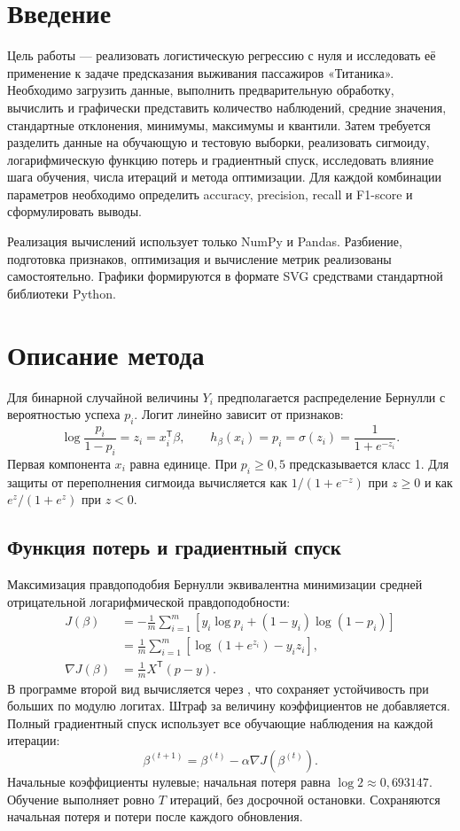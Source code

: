 \section{Введение}
Цель работы — реализовать логистическую регрессию с нуля и исследовать её применение к задаче предсказания выживания пассажиров «Титаника».
Необходимо загрузить данные, выполнить предварительную обработку, вычислить и графически представить количество наблюдений, средние значения, стандартные отклонения, минимумы, максимумы и квантили. Затем требуется разделить данные на обучающую и тестовую выборки, реализовать сигмоиду, логарифмическую функцию потерь и градиентный спуск, исследовать влияние шага обучения, числа итераций и метода оптимизации. Для каждой комбинации параметров необходимо определить accuracy, precision, recall и F1-score и сформулировать выводы.

Реализация вычислений использует только NumPy и Pandas. Разбиение, подготовка признаков, оптимизация и вычисление метрик реализованы самостоятельно. Графики формируются в формате SVG средствами стандартной библиотеки Python.

\section{Описание метода}
Для бинарной случайной величины $Y_i$ предполагается распределение Бернулли с вероятностью успеха $p_i$. Логит линейно зависит от признаков:
\[
\log\frac{p_i}{1-p_i}=z_i=x_i^\mathsf{T}\beta,\qquad
h_{\beta}(x_i)=p_i=\sigma(z_i)=\frac{1}{1+e^{-z_i}}.
\]
Первая компонента $x_i$ равна единице. При $p_i\geq0{,}5$ предсказывается класс 1. Для защиты от переполнения сигмоида вычисляется как $1/(1+e^{-z})$ при $z\geq0$ и как $e^z/(1+e^z)$ при $z<0$.

\subsection{Функция потерь и градиентный спуск}
Максимизация правдоподобия Бернулли эквивалентна минимизации средней отрицательной логарифмической правдоподобности:
\begin{align*}
J(\beta)
&=-\frac{1}{m}\sum_{i=1}^{m}\left[y_i\log p_i+(1-y_i)\log(1-p_i)\right]\\
&=\frac{1}{m}\sum_{i=1}^{m}\left[\log(1+e^{z_i})-y_i z_i\right],\\
\nabla J(\beta)&=\frac{1}{m}X^\mathsf{T}(p-y).
\end{align*}
В программе второй вид вычисляется через , что сохраняет устойчивость при больших по модулю логитах. Штраф за величину коэффициентов не добавляется. Полный градиентный спуск использует все обучающие наблюдения на каждой итерации:
\[
\beta^{(t+1)}=\beta^{(t)}-\alpha\nabla J(\beta^{(t)}).
\]
Начальные коэффициенты нулевые; начальная потеря равна $\log2\approx0{,}693147$. Обучение выполняет ровно $T$ итераций, без досрочной остановки. Сохраняются начальная потеря и потери после каждого обновления.

